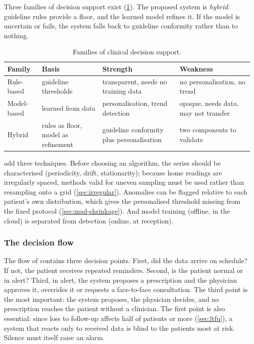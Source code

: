 Three families of decision support exist (\cref{tab:cdss-families}). The proposed system is \emph{hybrid}: guideline rules provide a floor, and the learned model refines it. If the model is uncertain or fails, the system falls back to guideline conformity rather than to nothing.

\begin{table}[htbp]
\centering\footnotesize
\caption{Families of clinical decision support.}\label{tab:cdss-families}
\begin{tabularx}{\textwidth}{@{}>{\raggedright\arraybackslash}p{2.0cm} >{\raggedright\arraybackslash}p{3.2cm} >{\raggedright\arraybackslash}X >{\raggedright\arraybackslash}X@{}}
\toprule
\textbf{Family} & \textbf{Basis} & \textbf{Strength} & \textbf{Weakness} \\
\midrule
Rule-based & guideline thresholds & transparent, needs no training data & no personalisation, no trend \\
Model-based & learned from data & personalisation, trend detection & opaque, needs data, may not transfer \\
Hybrid & rules as floor, model as refinement & guideline conformity plus personalisation & two components to validate \\
\bottomrule
\end{tabularx}
\end{table}

\Textcite{liu2025review} add three techniques. Before choosing an algorithm, the series should be characterised (periodicity, drift, stationarity); because home readings are irregularly spaced, methods valid for uneven sampling must be used rather than resampling onto a grid (\cref{sec:irregular}). Anomalies can be flagged relative to each patient's own distribution, which gives the personalised threshold missing from the fixed protocol (\cref{sec:mad-shrinkage}). And model training (offline, in the cloud) is separated from detection (online, at reception).

\subsubsection{The decision flow}\label{sec:decision-flow}

The flow of \textcite{yazdani2018} contains three decision points. First, did the data arrive on schedule? If not, the patient receives repeated reminders. Second, is the patient normal or in alert? Third, in alert, the system proposes a prescription and the physician approves it, overrides it or requests a face-to-face consultation. The third point is the most important: the system proposes, the physician decides, and no prescription reaches the patient without a clinician. The first point is also essential: since loss to follow-up affects half of patients or more (\cref{sec:ltfu}), a system that reacts only to received data is blind to the patients most at risk. Silence must itself raise an alarm.

